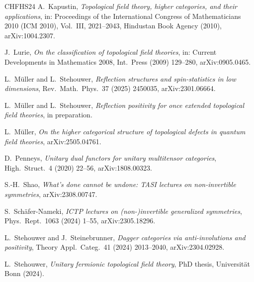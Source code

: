 \documentclass[11pt]{article}
\theoremstyle{definition}
\begin{document}
\begin{thebibliography}{CHFHS24}
A.~Kapustin,
\emph{Topological field theory, higher categories, and their applications},
in: Proceedings of the International Congress of Mathematicians 2010 (ICM 2010), Vol.\ III, 2021--2043, Hindustan Book Agency (2010),
arXiv:1004.2307.

J.~Lurie,
\emph{On the classification of topological field theories},
in: Current Developments in Mathematics 2008, Int.\ Press (2009) 129--280,
arXiv:0905.0465.

L.~M\"uller and L.~Stehouwer,
\emph{Reflection structures and spin-statistics in low dimensions},
Rev.\ Math.\ Phys.\ 37 (2025) 2450035,
arXiv:2301.06664.

L.~M\"uller and L.~Stehouwer,
\emph{Reflection positivity for once extended topological field theories},
in preparation.

L.~M\"uller,
\emph{On the higher categorical structure of topological defects in quantum field theories},
arXiv:2505.04761.

D.~Penneys,
\emph{Unitary dual functors for unitary multitensor categories},
High.\ Struct.\ 4 (2020) 22--56,
arXiv:1808.00323.

S.-H.~Shao,
\emph{What's done cannot be undone: TASI lectures on non-invertible symmetries},
arXiv:2308.00747.

S.~Sch\"afer-Nameki,
\emph{ICTP lectures on (non-)invertible generalized symmetries},
Phys.\ Rept.\ 1063 (2024) 1--55,
arXiv:2305.18296.

L.~Stehouwer and J.~Steinebrunner,
\emph{Dagger categories via anti-involutions and positivity},
Theory Appl.\ Categ.\ 41 (2024) 2013--2040,
arXiv:2304.02928.

L.~Stehouwer,
\emph{Unitary fermionic topological field theory},
PhD thesis, Universit\"at Bonn (2024).

\end{thebibliography}
\end{document}
